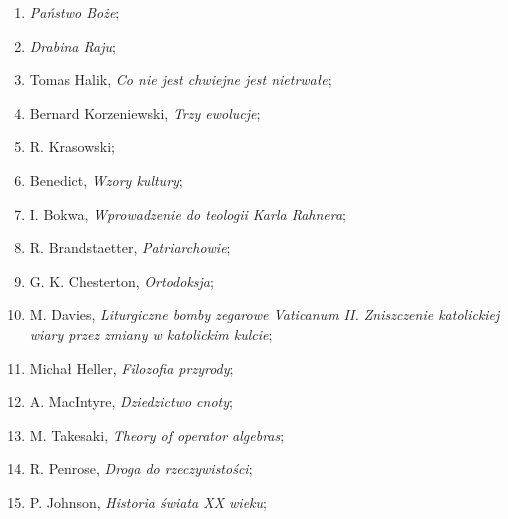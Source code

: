\documentclass[a4paper,11pt]{article}
\begin{document}
\begin{enumerate}
\item \textit{Państwo Boże};



\item \textit{Drabina Raju};



\item Tomas Halik, \textit{Co nie jest chwiejne jest nietrwałe};



\item Bernard Korzeniewski, \textit{Trzy ewolucje};



\item R. Krasowski;



\item Benedict, \textit{Wzory kultury};



\item I. Bokwa, \textit{Wprowadzenie do teologii Karla Rahnera};



\item R. Brandstaetter, \textit{Patriarchowie};



\item G. K. Chesterton, \textit{Ortodoksja};



\item M. Davies, \textit{Liturgiczne bomby zegarowe Vaticanum II.
    Zniszczenie katolickiej wiary przez zmiany w katolickim kulcie};



\item Michał Heller, \textit{Filozofia przyrody};



\item A. MacIntyre, \textit{Dziedzictwo cnoty};



\item M. Takesaki, \textit{Theory of operator algebras};



\item R. Penrose, \textit{Droga do rzeczywistości};



\item P. Johnson, \textit{Historia świata XX wieku};




\end{enumerate}
\end{document}
